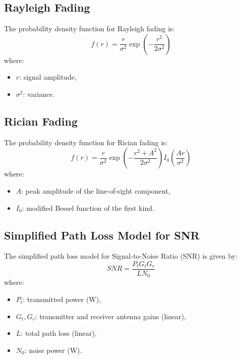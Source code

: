 \documentclass[a4paper,12pt]{book}
\begin{document}
	\subsection{Rayleigh Fading}
	
	The probability density function for Rayleigh fading is:
	\[
	f(r) = \frac{r}{\sigma^2} \exp \left( - \frac{r^2}{2\sigma^2} \right)
	\]
	where:
	\begin{itemize}
		\item \( r \): signal amplitude,
		\item \( \sigma^2 \): variance.
	\end{itemize}
	
	\subsection{Rician Fading}
	The probability density function for Rician fading is:
	\[
	f(r) = \frac{r}{\sigma^2} \exp \left( -\frac{r^2 + A^2}{2\sigma^2} \right) I_0 \left( \frac{Ar}{\sigma^2} \right)
	\]
	where:
	\begin{itemize}
		\item \( A \): peak amplitude of the line-of-sight component,
		\item \( I_0 \): modified Bessel function of the first kind.
	\end{itemize}
	
	\subsection{Simplified Path Loss Model for SNR}
	The simplified path loss model for Signal-to-Noise Ratio (SNR) is given by:
	\[
	SNR = \frac{P_t G_t G_r}{L N_0}
	\]
	where:
	\begin{itemize}
		\item \( P_t \): transmitted power (W),
		\item \( G_t, G_r \): transmitter and receiver antenna gains (linear),
		\item \( L \): total path loss (linear),
		\item \( N_0 \): noise power (W).
	\end{itemize}    
	
	
\end{document}
